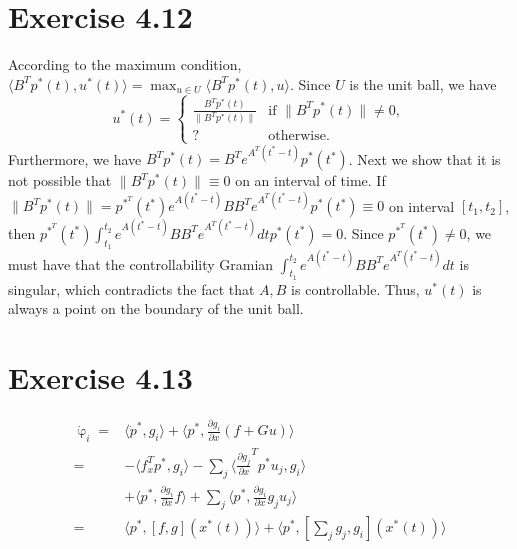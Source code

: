 \documentclass[11pt]{report}
\begin{document}

\section*{Exercise 4.12}
According to the maximum condition, $\langle B^T p^*(t), u^*(t)\rangle = \max_{u \in U}\langle B^T p^*(t), u\rangle$. Since $U$ is the unit ball, we have
\[
u^*(t) = \begin{cases} \frac{B^T p^*(t)}{\|B^T p^*(t)\|} & \mbox{if } \|B^T p^*(t)\| \neq 0,\\ ? & \mbox{otherwise}.\end{cases}
\]
Furthermore, we have $B^T p^*(t) = B^T e^{A^T(t^*-t)} p^*(t^*)$. Next we show that it is not possible that $\|B^T p^*(t)\| \equiv 0$ on an interval of time. If $\|B^T p^*(t)\| = p^*^T(t^*) e^{A(t^*-t)} B B^T e^{A^T(t^*-t)} p^*(t^*) \equiv 0$ on interval $[t_1, t_2]$, then $p^*^T(t^*) \int_{t_1}^{t_2} e^{A(t^*-t)} B B^T e^{A^T(t^*-t)} dt p^*(t^*) = 0$. Since $p^*^T(t^*) \neq 0$, we must have that the controllability Gramian $\int_{t_1}^{t_2} e^{A(t^*-t)} B B^T e^{A^T(t^*-t)} dt$ is singular, which contradicts the fact that $A, B$ is controllable. Thus, $u^*(t)$ is always a point on the boundary of the unit ball.

\section*{Exercise 4.13}
\begin{align*}
\dot{\upvarphi}_i = & \langle \dot{p}^*, g_i \rangle + \langle p^*, \frac{\partial g_i}{\partial x}(f + Gu) \rangle\\
= & - \langle f_x^T p^*, g_i \rangle - \sum_j \langle \frac{\partial g_j}{\partial x}^T p^* u_j, g_i \rangle\\
& + \langle p^*, \frac{\partial g_i}{\partial x}f\rangle + \sum_j \langle p^*,  \frac{\partial g_i}{\partial x} g_j u_j\rangle\\
= & \langle p^*, [f,g](x^*(t)) \rangle + \langle p^*, [\sum_j g_j,g_i](x^*(t)) \rangle
\end{align*}
\end{document}
